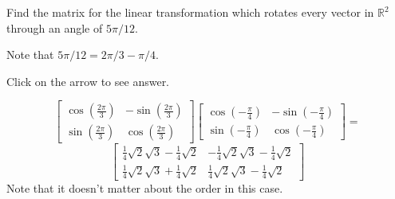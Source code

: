\documentclass{ximera}
\begin{document}
\begin{problem}\label{prb:6.24} Find the matrix for the linear transformation which rotates every
vector in $\mathbb{R}^{2}$ through an angle of $5\pi /12.$ 
\begin{hint}
Note that $5\pi /12=2\pi /3-\pi /4.$
\end{hint}

Click on the arrow to see answer.
\begin{expandable}
\[
\left[
\begin{array}{cc}
\cos \left( \frac{2\pi }{3}\right) & -\sin \left( \frac{2\pi }{3}\right) \\
\sin \left( \frac{2\pi }{3}\right) & \cos \left( \frac{2\pi }{3}\right)
\end{array}
\right] \left[
\begin{array}{cc}
\cos \left( -\frac{\pi }{4}\right) & -\sin \left( -\frac{\pi }{4}\right) \\
\sin \left( -\frac{\pi }{4}\right) & \cos \left( -\frac{\pi }{4}\right)
\end{array}
\right] =
\]
\[
\left[
\begin{array}{cc}
\frac{1}{4}\sqrt{2}\sqrt{3}-\frac{1}{4}\sqrt{2} & -\frac{1}{4}\sqrt{2}\sqrt{3
}-\frac{1}{4}\sqrt{2} \\
\frac{1}{4}\sqrt{2}\sqrt{3}+\frac{1}{4}\sqrt{2} & \frac{1}{4}\sqrt{2}\sqrt{3}
-\frac{1}{4}\sqrt{2}
\end{array}
\right]
\]
Note that it doesn't matter about the order in this case.
\end{expandable}
\end{problem}
\end{document}
